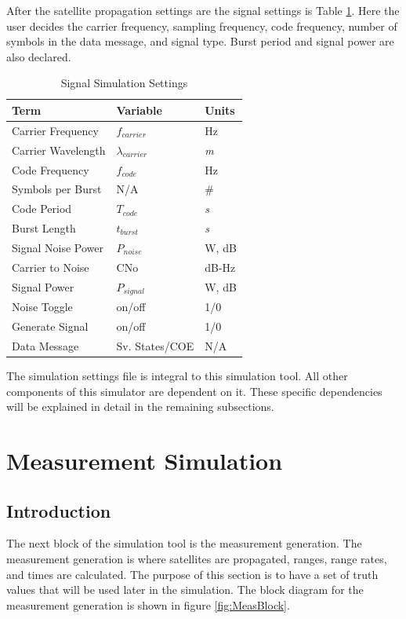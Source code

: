 \documentclass[12pt]{report}
\begin{document}
\pagebreak

After the satellite propagation settings are the signal settings is Table \ref{table:sigsimsettings}. Here the user decides the carrier frequency, sampling frequency, code frequency, number of symbols in the data message, and signal type. Burst period and signal power are also declared. 

\begin{table}[hbt!]
    \centering
    \begin{tabular}{m{5cm} m{3cm} m{3cm}}
        \hline
        Term & Variable & Units \\
    \hline
        Carrier Frequency & $f_{carrier}$ & Hz \\
        Carrier Wavelength & $\lambda_{carrier}$ & \textit{m}\\
        Code Frequency & $f_{code}$ & Hz \\
        Symbols per Burst & N/A & \# \\
        Code Period & $T_{code} $ & \textit{s} \\
        Burst Length & $t_{burst}$ & \textit{s} \\
        Signal Noise Power & $P_{noise}$ & W, dB \\
        Carrier to Noise & CNo & dB-Hz \\
        Signal Power & $P_{signal}$ & W, dB \\
        Noise Toggle & on/off & 1/0 \\
        Generate Signal & on/off & 1/0 \\
        Data Message & Sv. States/COE & N/A \\
    \end{tabular}
    \caption{Signal Simulation Settings}
    \label{table:sigsimsettings}
\end{table}


The simulation settings file is integral to this simulation tool. All other components of this simulator are dependent on it. These specific dependencies will be explained in detail in the remaining subsections.

\pagebreak
\section{Measurement Simulation}
\subsection{Introduction}
The next block of the simulation tool is the measurement generation. The measurement generation is where satellites are propagated, ranges, range rates, and times are calculated. The purpose of this section is to have a set of truth values that will be used later in the simulation. The block diagram for the measurement generation is shown in figure \ref{fig:MeasBlock}.
\end{document}
